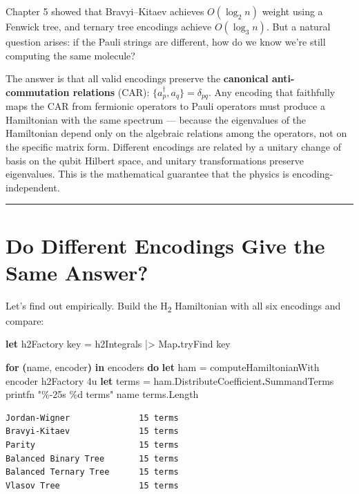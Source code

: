 \documentclass[
  11pt,
  oneside]{book}
\newenvironment{Shaded}{\begin{snugshade}}{\end{snugshade}}
\newcommand{\DecValTok}[1]{\textcolor[rgb]{0.00,0.00,0.81}{#1}}
\newcommand{\KeywordTok}[1]{\textcolor[rgb]{0.13,0.29,0.53}{\textbf{#1}}}
\newcommand{\NormalTok}[1]{#1}
\newcommand{\OperatorTok}[1]{\textcolor[rgb]{0.81,0.36,0.00}{\textbf{#1}}}
\newcommand{\StringTok}[1]{\textcolor[rgb]{0.31,0.60,0.02}{#1}}
\begin{document}
Chapter 5 showed that Bravyi--Kitaev achieves \(O(\log_2 n)\) weight
using a Fenwick tree, and ternary tree encodings achieve
\(O(\log_3 n)\). But a natural question arises: if the Pauli strings are
different, how do we know we're still computing the same molecule?

The answer is that all valid encodings preserve the \textbf{canonical
anti-commutation relations} (CAR):
\(\{a_p^\dagger, a_q\} = \delta_{pq}\). Any encoding that faithfully
maps the CAR from fermionic operators to Pauli operators must produce a
Hamiltonian with the same spectrum --- because the eigenvalues of the
Hamiltonian depend only on the algebraic relations among the operators,
not on the specific matrix form. Different encodings are related by a
unitary change of basis on the qubit Hilbert space, and unitary
transformations preserve eigenvalues. This is the mathematical guarantee
that the physics is encoding-independent.

\begin{center}\rule{0.5\linewidth}{0.5pt}\end{center}

\section{Do Different Encodings Give the Same
Answer?}\label{do-different-encodings-give-the-same-answer}

Let's find out empirically. Build the H\textsubscript{2} Hamiltonian with all six
encodings and compare:

\begin{Shaded}
\begin{Highlighting}[]
\KeywordTok{let}\NormalTok{ h2Factory key = h2Integrals |\textgreater{} Map}\KeywordTok{.}\NormalTok{tryFind key}

\KeywordTok{for} \OperatorTok{(}\NormalTok{name, encoder}\OperatorTok{)} \KeywordTok{in}\NormalTok{ encoders }\KeywordTok{do}
    \KeywordTok{let}\NormalTok{ ham = computeHamiltonianWith encoder h2Factory }\DecValTok{4}\NormalTok{u}
    \KeywordTok{let}\NormalTok{ terms = ham.DistributeCoefficient}\KeywordTok{.}\NormalTok{SummandTerms}
\NormalTok{    printfn }\StringTok{"\%{-}25s  \%d terms"}\NormalTok{ name terms.Length}
\end{Highlighting}
\end{Shaded}

\begin{verbatim}
Jordan-Wigner              15 terms
Bravyi-Kitaev              15 terms
Parity                     15 terms
Balanced Binary Tree       15 terms
Balanced Ternary Tree      15 terms
Vlasov Tree                15 terms
\end{verbatim}
\end{document}
